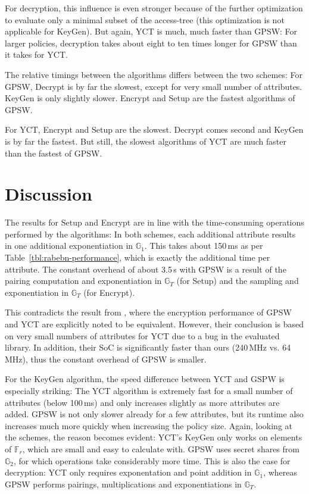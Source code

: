 For decryption, this influence is even stronger because of the further optimization to evaluate only a minimal subset of the \gls{access-tree} (this optimization is not applicable for KeyGen).
But again, YCT is much, much faster than GPSW: For larger policies, decryption takes about eight to ten times longer for GPSW than it takes for YCT.

The relative timings between the algorithms differs between the two schemes:
For GPSW, Decrypt is by far the slowest, except for very small number of attributes. KeyGen is only slightly slower.
Encrypt and Setup are the fastest algorithms of GPSW.

For YCT, Encrypt and Setup are the slowest.
Decrypt comes second and KeyGen is by far the fastest.
But still, the slowest algorithms of YCT are much faster than the fastest of GPSW.


\section{Discussion}
The results for Setup and Encrypt are in line with the time-consuming operations performed by the algorithms: 
In both schemes, each additional attribute results in one additional exponentiation in $\mathbb{G}_1$.
This takes about 150\,ms as per Table~\ref{tbl:rabebn-performance}, which is exactly the additional time per attribute.
The constant overhead of about 3.5\,s with GPSW is a result of the pairing computation and exponentiation in $\mathbb{G}_T$ (for Setup) and the sampling and exponentiation in $\mathbb{G}_T$ (for Encrypt).

This contradicts the result from \cite{girgenti_feasibility_2019}, where the encryption performance of GPSW and YCT are explicitly noted to be equivalent.
However, their conclusion is based on very small numbers of attributes for YCT due to a bug in the evaluated library.
In addition, their SoC is significantly faster than ours (240\,MHz vs. 64\,MHz), thus the constant overhead of GPSW is smaller.

For the KeyGen algorithm, the speed difference between YCT and GSPW is especially striking: 
The YCT algorithm is extremely fast for a small number of attributes (below 100\,ms) and only increases slightly as more attributes are added.
GPSW is not only slower already for a few attributes, but its runtime also increases much more quickly when increasing the policy size.
Again, looking at the schemes, the reason becomes evident: YCT's KeyGen only works on elements of $\mathbb{F}_r$, which are small and easy to calculate with.
GPSW uses secret shares from $\mathbb{G}_2$, for which operations take considerably more time.
This is also the case for decryption: YCT only requires exponentation and point addition in $\mathbb{G}_1$, whereas GPSW performs pairings, multiplications and exponentiations in $\mathbb{G}_T$.

